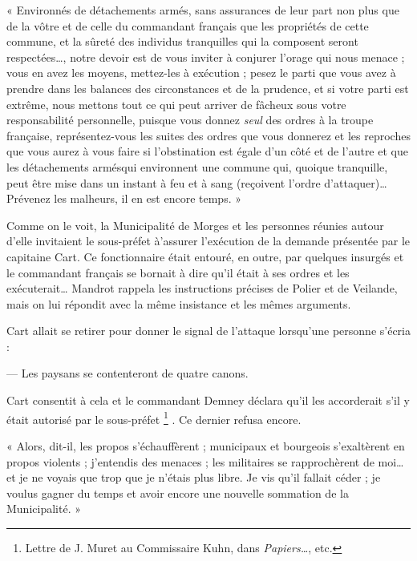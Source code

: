 \documentclass[french,twoside]{book} %
\newenvironment{quoteblock}%
  {\begin{quoting}}
  {\end{quoting}}
\newenvironment{quotebar}{%
    \def\FrameCommand{{\color{rubric!10!}\vrule width 0.5em} \hspace{0.9em}}%
    \def\OuterFrameSep{\itemsep} %
    \MakeFramed {\advance\hsize-\width \FrameRestore}
  }%
  {%
    \endMakeFramed
  }
\renewenvironment{quoteblock}%
  {%
    \savenotes
    \setstretch{0.9}
    \begin{quotebar}
  }
  {%
    \end{quotebar}
    \spewnotes
  }
\begin{document}
\begin{quoteblock}
 \noindent « Environnés de détachements armés, sans assurances de leur part non plus que de la vôtre et de celle du commandant français que les propriétés de cette commune, et la sûreté des individus tranquilles qui la composent seront respectées…, notre devoir est de vous inviter à conjurer l’orage qui nous menace ; vous en avez les moyens, mettez-les à exécution ; pesez le parti que vous avez à prendre dans les balances des circonstances et de la prudence, et si votre parti est extrême, nous mettons tout ce qui peut arriver de fâcheux sous votre responsabilité personnelle, puisque vous donnez \emph{seul} des ordres à la troupe française, représentez-vous les suites des ordres que vous donnerez et les reproches que vous aurez à vous faire si l’obstination est égale d’un côté et de l’autre et que les détachements armésqui environnent une commune qui, quoique tranquille, peut être mise dans un instant à feu et à sang (reçoivent l’ordre d’attaquer)… Prévenez les malheurs, il en est encore temps. »
 \end{quoteblock}

\noindent Comme on le voit, la Municipalité de Morges et les personnes réunies autour d’elle invitaient le sous-préfet à'assurer l’exécution de la demande présentée par le capitaine Cart. Ce fonctionnaire était entouré, en outre, par quelques insurgés et le commandant français se bornait à dire qu’il était à ses ordres et les exécuterait… Mandrot rappela les instructions précises de Polier et de Veilande, mais on lui répondit avec la même insistance et les mêmes arguments.\par
Cart allait se retirer pour donner le signal de l’attaque lorsqu’une personne s’écria :\par
— Les paysans se contenteront de quatre canons.\par
Cart consentit à cela et le commandant Demney déclara qu’il les accorderait s’il y était autorisé par le sous-préfet \footnote{Lettre de J. Muret au Commissaire Kuhn, dans \emph{Papiers…}, etc.} . Ce dernier refusa encore.\par

\begin{quoteblock}
 \noindent « Alors, dit-il, les propos s’échauffèrent ; municipaux et bourgeois s’exaltèrent en propos violents ; j’entendis des menaces ; les militaires se rapprochèrent de moi… et je ne voyais que trop que je n’étais plus libre. Je vis qu’il fallait céder ; je voulus gagner du temps et avoir encore une nouvelle sommation de la Municipalité. »
 \end{quoteblock}
\end{document}
